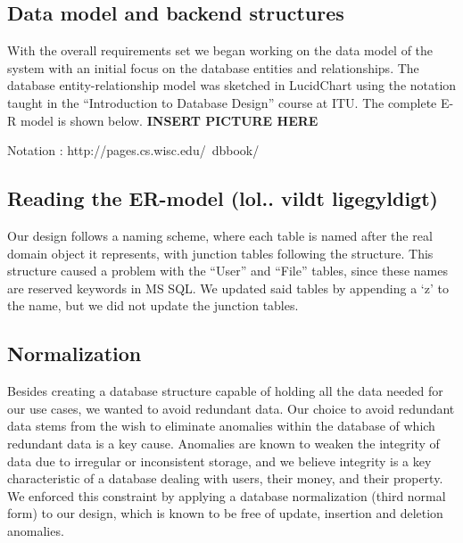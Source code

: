 \subsection{Data model and backend structures}
\label{sec:datamodel}

With the overall requirements set we began working on the data model of the system with an initial focus on the database entities and relationships. The database entity-relationship model was sketched in LucidChart using the notation taught in the “Introduction to Database Design” course at ITU. The complete E-R  model is shown below.
\textbf{INSERT PICTURE HERE}

Notation : http://pages.cs.wisc.edu/~dbbook/

\subsection{Reading the ER-model (lol.. vildt ligegyldigt)}
\label{sec:readingdatamodel}
Our design follows a naming scheme, where each table is named after the real domain object it represents, with junction tables following the structure.
This structure caused a problem with the “User” and “File” tables, since these names are reserved keywords in MS SQL. We updated said tables by appending a ‘z’ to the name, but we did not update the junction tables.

\subsection{Normalization}
\label{sec:normalization}
Besides creating a database structure capable of holding all the data needed for our use cases, we wanted to avoid redundant data. Our choice to avoid redundant data stems from the wish to eliminate anomalies within the database of which redundant data is a key cause. Anomalies are known to weaken the integrity of data due to irregular or inconsistent storage, and we believe integrity is a key characteristic of a database dealing with users, their money, and their property. We enforced this constraint by applying a database normalization (third normal form) to our design, which is known to be free of update, insertion and deletion anomalies.

